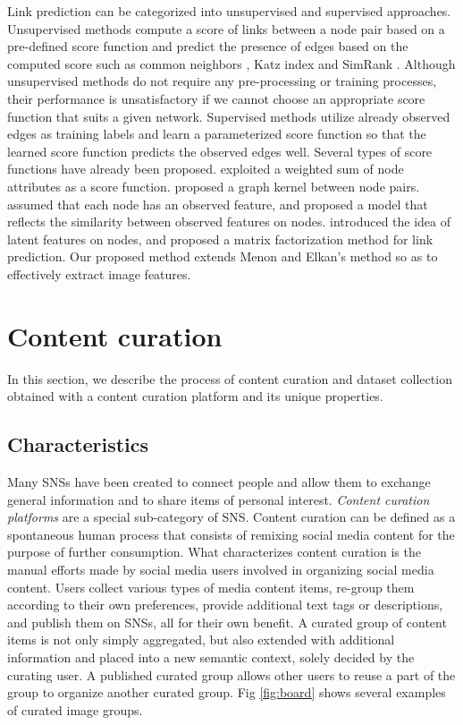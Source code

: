 \documentclass[letterpaper]{article} %
\begin{document}
Link prediction can be categorized into unsupervised and supervised approaches.
Unsupervised methods compute a score of links between a node pair based on a pre-defined score function and predict the presence of edges based on the computed score such as common neighbors \cite{Kossinets2006}, Katz index \cite{Katz1953} and SimRank \cite{Jeh2002}.
Although unsupervised methods do not require any pre-processing or training processes, their performance is unsatisfactory if we cannot choose an appropriate score function that suits a given network.
Supervised methods utilize already observed edges as training labels and learn a parameterized score function so that the learned score function predicts the observed edges well.
Several types of score functions have already been proposed.
\cite{Wang2007} exploited a weighted sum of node attributes as a score function.
\cite{Kashima2009} proposed a graph kernel between node pairs.
\cite{Scripps2008} assumed that each node has an observed feature, and proposed a model that reflects the similarity between observed features on nodes.
\cite{Menon2011} introduced the idea of latent features on nodes, and proposed a matrix factorization method for link prediction.
Our proposed method extends Menon and Elkan's method so as to effectively extract image features.


\section{Content curation}
\label{sec:curation}

In this section, we describe the process of content curation and dataset collection obtained with a content curation platform and its unique properties.

\subsection{Characteristics}
\label{sec:curation:def}
\indent

Many SNSs have been created to connect people and allow them to exchange general information and to share items of personal interest.
\textit{Content curation platforms} are a special sub-category of SNS.
Content curation can be defined as a spontaneous human process that consists of remixing social media content for the purpose of further consumption.
What characterizes content curation is the manual efforts made by social media users involved in organizing social media content.
Users collect various types of media content items, re-group them according to their own preferences, provide additional text tags or descriptions, and publish them on SNSs, all for their own benefit.
A curated group of content items is not only simply aggregated, but also extended with additional information and placed into a new semantic context, solely decided by the curating user.
A published curated group allows other users to reuse a part of the group to organize another curated group.
Fig \ref{fig:board} shows several examples of curated image groups.
\end{document}
